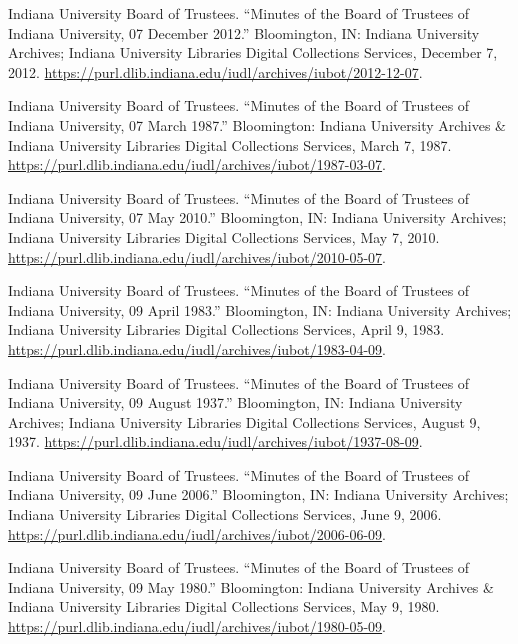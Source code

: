 \documentclass[
  american,
  letterpaper,
]{scrreprt}
\newlength{\cslhangindent}
\newenvironment{CSLReferences}[2] %
 {\begin{list}{}{%
  \setlength{\itemindent}{0pt}
  \setlength{\leftmargin}{0pt}
  \setlength{\parsep}{0pt}
  \ifodd #1
   \setlength{\leftmargin}{\cslhangindent}
   \setlength{\itemindent}{-1\cslhangindent}
  \fi
  \setlength{\itemsep}{#2\baselineskip}}}
 {\end{list}}
\begin{document}
\begin{CSLReferences}{1}{0}
Indiana University Board of Trustees. {``Minutes of the Board of
Trustees of Indiana University, 07 December 2012.''} Bloomington, IN:
Indiana University Archives; Indiana University Libraries Digital
Collections Services, December 7, 2012.
\url{https://purl.dlib.indiana.edu/iudl/archives/iubot/2012-12-07}.

Indiana University Board of Trustees. {``Minutes of the Board of
Trustees of Indiana University, 07 March 1987.''} Bloomington: Indiana
University Archives \& Indiana University Libraries Digital Collections
Services, March 7, 1987.
\url{https://purl.dlib.indiana.edu/iudl/archives/iubot/1987-03-07}.

Indiana University Board of Trustees. {``Minutes of the Board of
Trustees of Indiana University, 07 May 2010.''} Bloomington, IN: Indiana
University Archives; Indiana University Libraries Digital Collections
Services, May 7, 2010.
\url{https://purl.dlib.indiana.edu/iudl/archives/iubot/2010-05-07}.

Indiana University Board of Trustees. {``Minutes of the Board of
Trustees of Indiana University, 09 April 1983.''} Bloomington, IN:
Indiana University Archives; Indiana University Libraries Digital
Collections Services, April 9, 1983.
\url{https://purl.dlib.indiana.edu/iudl/archives/iubot/1983-04-09}.

Indiana University Board of Trustees. {``Minutes of the Board of
Trustees of Indiana University, 09 August 1937.''} Bloomington, IN:
Indiana University Archives; Indiana University Libraries Digital
Collections Services, August 9, 1937.
\url{https://purl.dlib.indiana.edu/iudl/archives/iubot/1937-08-09}.

Indiana University Board of Trustees. {``Minutes of the Board of
Trustees of Indiana University, 09 June 2006.''} Bloomington, IN:
Indiana University Archives; Indiana University Libraries Digital
Collections Services, June 9, 2006.
\url{https://purl.dlib.indiana.edu/iudl/archives/iubot/2006-06-09}.

Indiana University Board of Trustees. {``Minutes of the Board of
Trustees of Indiana University, 09 May 1980.''} Bloomington: Indiana
University Archives \& Indiana University Libraries Digital Collections
Services, May 9, 1980.
\url{https://purl.dlib.indiana.edu/iudl/archives/iubot/1980-05-09}.


\end{CSLReferences}
\end{document}
